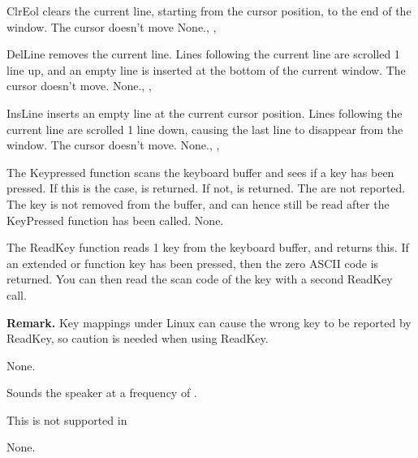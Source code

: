 %
%


{ ClrEol clears the current line, starting from the cursor position, to the
end of the window. The cursor doesn't move}
{None.}{, , }




{ DelLine removes the current line. Lines following the current line are 
scrolled 1 line up, and an empty line is inserted at the bottom of the
current window. The cursor doesn't move.}
{None.}{, , }




{ InsLine inserts an empty line at the current cursor position. 
Lines following the current line are scrolled 1 line down, 
causing the last line to disappear from the window. 
The cursor doesn't move.}
{None.}{, , }




{ The Keypressed function scans the keyboard buffer and sees if a key has
been pressed. If this is the case,  is returned. If not,
 is returned. The  are not reported.
The key is not removed from the buffer, and can hence still be read after
the KeyPressed function has been called.
}
{None.}{}




{
The ReadKey function reads 1 key from the keyboard buffer, and returns this.
If an extended or function key has been pressed, then the zero ASCII code is 
returned. You can then read the scan code of the key with a second ReadKey
call.

\textbf{Remark.} Key mappings under Linux can cause the wrong key to be
reported by ReadKey, so caution is needed when using ReadKey.  
}
{None.}{}




{ Sounds the speaker at a frequency of .

This is not supported in \linux}{None.}{}



